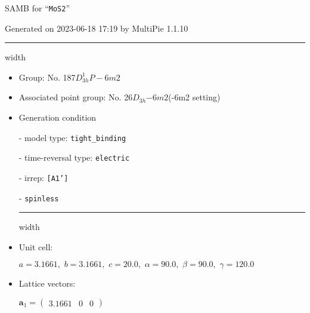 \documentclass[fleqn,10pt,landscape]{article}
\begin{document}
\setcounter{MaxMatrixCols}{16}

\setlength{\baselineskip}{16pt}
\footnotesize
\begin{center}
\LARGE
SAMB for ``\texttt{MoS2}''
\end{center}
\begin{flushright}
Generated on 2023-06-18 17:19 by MultiPie 1.1.10
\end{flushright}
\vspace{1cm}


 \hfil \hrule height 1mm width \textwidth \hfil

\begin{itemize}
\item Group: No. 187\quad$D_{3h}^{1}$\quad$P-6m2$\quad[ hexagonal ]

\item Associated point group: No. 26\quad$D_{3h}$\quad$-6m2$\quad(-6m2 setting)\quad[ hexagonal ]

\vspace{5mm}

\item Generation condition

\quad - model type: \texttt{tight_binding}

\quad - time-reversal type: \texttt{electric}

\quad - irrep: \texttt{[A1']}

\quad - \texttt{spinless}


 \hfil \hrule height 1mm width \textwidth \hfil

\item Unit cell:

\quad $a=3.1661,\,\, b=3.1661,\,\, c=20.0,\,\, \alpha=90.0,\,\, \beta=90.0,\,\, \gamma=120.0$

\item Lattice vectors:

\quad $\bm{a}_1=\begin{pmatrix} 3.1661 & 0 & 0 \end{pmatrix}$


\end{itemize}
\end{document}
